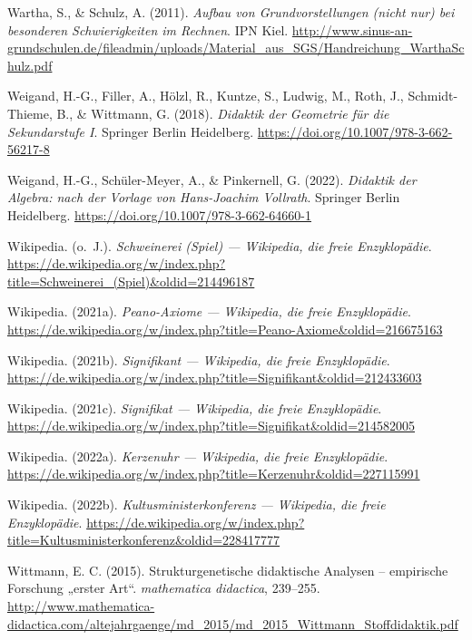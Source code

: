 \documentclass[
]{scrbook}
\newlength{\cslhangindent}
\newenvironment{CSLReferences}[2] %
 {\begin{list}{}{%
  \setlength{\itemindent}{0pt}
  \setlength{\leftmargin}{0pt}
  \setlength{\parsep}{0pt}
  \ifodd #1
   \setlength{\leftmargin}{\cslhangindent}
   \setlength{\itemindent}{-1\cslhangindent}
  \fi
  \setlength{\itemsep}{#2\baselineskip}}}
 {\end{list}}
\theoremstyle{definition}
\theoremstyle{definition}
\theoremstyle{definition}
\theoremstyle{definition}
\theoremstyle{remark}
\begin{document}
\begin{CSLReferences}{1}{0}
Wartha, S., \& Schulz, A. (2011). \emph{Aufbau von {Grundvorstellungen} (nicht nur) bei besonderen {Schwierigkeiten} im {Rechnen}}. IPN Kiel. \url{http://www.sinus-an-grundschulen.de/fileadmin/uploads/Material_aus_SGS/Handreichung_WarthaSchulz.pdf}

Weigand, H.-G., Filler, A., Hölzl, R., Kuntze, S., Ludwig, M., Roth, J., Schmidt-Thieme, B., \& Wittmann, G. (2018). \emph{Didaktik der {Geometrie} für die {Sekundarstufe} {I}}. Springer Berlin Heidelberg. \url{https://doi.org/10.1007/978-3-662-56217-8}

Weigand, H.-G., Schüler-Meyer, A., \& Pinkernell, G. (2022). \emph{Didaktik der {Algebra}: nach der {Vorlage} von {Hans}-{Joachim} {Vollrath}}. Springer Berlin Heidelberg. \url{https://doi.org/10.1007/978-3-662-64660-1}

Wikipedia. (o.~J.). \emph{Schweinerei (Spiel) --- Wikipedia{,} die freie Enzyklopädie}. \url{https://de.wikipedia.org/w/index.php?title=Schweinerei_(Spiel)&oldid=214496187}

Wikipedia. (2021a). \emph{Peano-Axiome --- Wikipedia{,} die freie Enzyklopädie}. \url{https://de.wikipedia.org/w/index.php?title=Peano-Axiome&oldid=216675163}

Wikipedia. (2021b). \emph{Signifikant --- Wikipedia{,} die freie Enzyklopädie}. \url{https://de.wikipedia.org/w/index.php?title=Signifikant&oldid=212433603}

Wikipedia. (2021c). \emph{Signifikat --- Wikipedia{,} die freie Enzyklopädie}. \url{https://de.wikipedia.org/w/index.php?title=Signifikat&oldid=214582005}

Wikipedia. (2022a). \emph{Kerzenuhr --- Wikipedia{,} die freie Enzyklopädie}. \url{https://de.wikipedia.org/w/index.php?title=Kerzenuhr&oldid=227115991}

Wikipedia. (2022b). \emph{Kultusministerkonferenz --- Wikipedia{,} die freie Enzyklopädie}. \url{https://de.wikipedia.org/w/index.php?title=Kultusministerkonferenz&oldid=228417777}

Wittmann, E. C. (2015). Strukturgenetische didaktische {Analysen} -- empirische {Forschung} „erster {Art}``. \emph{mathematica didactica}, 239--255. \url{http://www.mathematica-didactica.com/altejahrgaenge/md_2015/md_2015_Wittmann_Stoffdidaktik.pdf}


\end{CSLReferences}
\end{document}
